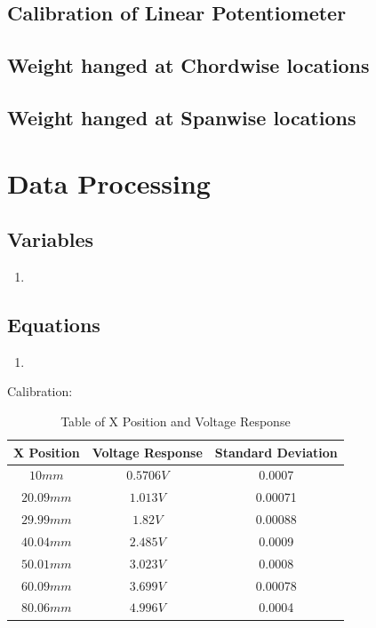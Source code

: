 \documentclass{article}
\begin{document}
\subsection{Calibration of Linear Potentiometer}

\subsection{Weight hanged at Chordwise locations}

\subsection{Weight hanged at Spanwise locations}

\section{Data Processing}
\subsection*{Variables}
\begin{enumerate}[label = \roman*.]
    \item
\end{enumerate}

\subsection*{Equations}
\begin{enumerate}[label = \Roman*.]
    \item 
\end{enumerate} 

Calibration:
\begin{table}[ht]
\centering
\begin{tabular}{|c|c|c|}
\hline
\textbf{X Position} & \textbf{Voltage Response} & \textbf{Standard Deviation} \\
\hline
$10 mm$ & $0.5706 V$ & 0.0007\\
\hline
$20.09 mm$ & $1.013 V$ & 0.00071 \\
\hline
$29.99 mm$ & $1.82 V$ & 0.00088 \\
\hline
$40.04 mm$ & $2.485 V$ & 0.0009\\
\hline
$50.01 mm$ & $3.023 V$ & 0.0008\\
\hline
$60.09 mm$ & $3.699 V$ & 0.00078\\
\hline
$80.06 mm$ & $4.996 V$ & 0.0004\\
\hline
\end{tabular}
\caption{Table of X Position and Voltage Response}
\label{tab:position_voltage}
\end{table}
\end{document}
